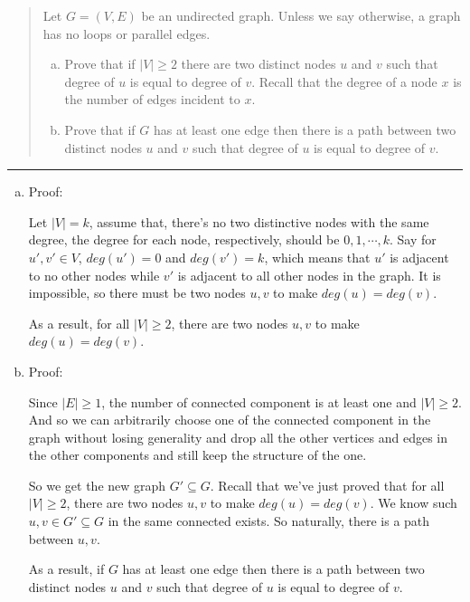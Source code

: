 \documentclass[11pt]{article}
\begin{document}



\begin{quote}
Let $G = (V, E)$ be an undirected graph. Unless we say otherwise, a graph has no loops or parallel edges.

\begin{enumerate}[(a)]
\item
Prove that if $|V| \geq 2$ there are two distinct nodes $u$ and $v$ such that degree of $u$ is equal to degree of $v$. Recall that the degree of a node $x$ is the number of edges incident to $x$.

\item
Prove that if $G$ has at least one edge then there is a path between two distinct nodes $u$ and $v$ such that degree of $u$ is equal to degree of $v$.

\end{enumerate}
\end{quote}
\hrule



\begin{solution}
\begin{enumerate}[(a)]
\item Proof:

	Let $|V| = k$, assume that, there's no two distinctive nodes with the same degree, the degree for each node, respectively, should be $0, 1, \cdots , k$. Say for $u', v' \in V$, $deg(u') = 0$ and $deg(v') = k$, which means that $u'$ is adjacent to no other nodes while $v'$ is adjacent to all other nodes in the graph. It is impossible, so there must be two nodes $u, v$ to make $deg(u) = deg(v)$.
	
	As a result, for all $|V| \geq 2$, there are two nodes $u, v$ to make $deg(u) = deg(v)$.
	
\item Proof:

	Since $|E| \geq 1$, the number of connected component is at least one and $|V| \geq 2$. And so we can arbitrarily choose one of the connected component in the graph without losing generality and drop all the other vertices and edges in the other components and still keep the structure of the one.
	
	So we get the new graph $G' \subseteq G$. Recall that we've just proved that for all $|V| \geq 2$, there are two nodes $u, v$ to make $deg(u) = deg(v)$. We know such $u, v \in G' \subseteq G$ in the same connected exists. So naturally, there is a path between $u, v$.
	
	As a result, if $G$ has at least one edge then there is a path between two distinct nodes $u$ and $v$ such that degree of $u$ is equal to degree of $v$.
	
\end{enumerate}
\end{solution}
\end{document}
